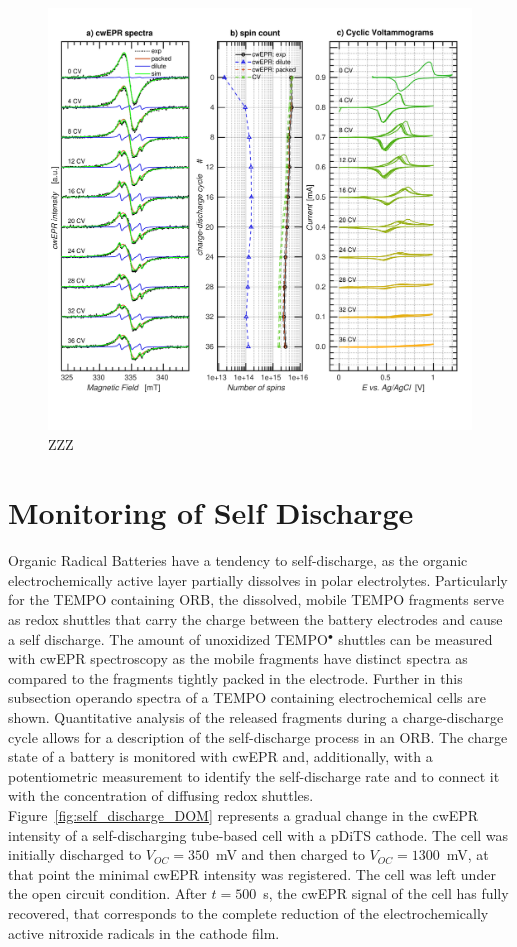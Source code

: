 \begin{figure}[!h]
\center
	\includegraphics[width=1\textwidth]{./operando_epr/figures/degradation/repeated_cycling_degradation_dits.pdf}
	\caption{ZZZ}
	\label{fig:repeated_cycling_degradation}
\end{figure}





\section{Monitoring of Self Discharge}
Organic Radical Batteries have a tendency to self-discharge, as the organic electrochemically active layer partially dissolves in polar electrolytes. Particularly for the TEMPO containing ORB, the dissolved, mobile TEMPO fragments serve as redox shuttles that carry the charge between the battery electrodes and cause a self discharge. The amount of unoxidized TEMPO$^\bullet$ shuttles can be measured with cwEPR spectroscopy as the mobile fragments have distinct spectra as compared to the fragments tightly packed in the electrode. Further in this subsection operando spectra of a TEMPO containing electrochemical cells are shown. Quantitative analysis of the released fragments during a charge-discharge cycle allows for a description of the self-discharge process in an ORB. The charge state of a battery is monitored with cwEPR and, additionally, with a potentiometric measurement to identify the self-discharge rate and to connect it with the concentration of diffusing redox shuttles. Figure~\ref{fig:self_discharge_DOM} represents a gradual change in the cwEPR intensity of a self-discharging tube-based cell with a pDiTS cathode. The cell was initially discharged to $V_{OC}=350$~mV and then charged to $V_{OC}=1300$~mV, at that point the minimal cwEPR intensity was registered. The cell was left under the open circuit condition. After $t=500$~s, the cwEPR signal of the cell has fully recovered, that corresponds to the complete reduction of the electrochemically active nitroxide radicals in the cathode film.

